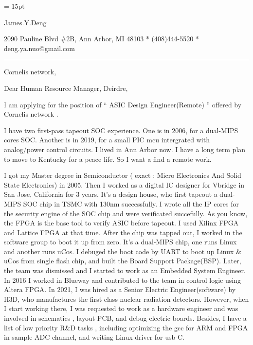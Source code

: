 

  \FFrg \baselineskip = 15pt

{
James.Y.Deng
}

{ 
2090 Pauline Blvd \#2B, Ann Arbor, MI 48103
*
(408)444-5520
*
deng.ya.nuo@gmail.com
}

{ \smallbreak } 

{\par\noindent\hrule} 

{ \bigbreak } 



Cornelis network, 


{ \bigbreak } 
{ 
Dear Human Resource Manager, Deirdre,
}

{ \bigbreak } 
I am applying for the position of `` 
ASIC Design Engineer(Remote)
'' offered by Cornelis network .

{ \bigbreak } 
I have two first-pass tapeout SOC experience.
One is in 2006, for a dual-MIPS cores SOC. 
Another is in 2019, for a small PIC mcu intergrated with analog/power control circuits.
I lived in Ann Arbor now. I have a long term plan to move to Kentucky for a peace life.
So I want a find a remote work.

{ \bigbreak } 
I got my Master degree in Semiconductor ( exact : Micro Electronics And Solid State Electronics) in 2005.
Then I worked as a digital IC designer for Vbridge in San Jose, California for 3 years.
It's a design house, who first tapeout a dual-MIPS SOC chip in TSMC with 130nm successfully.
I wrote all the IP cores for the security engine of the SOC chip and were verificated succefully.
As you know, the FPGA is the base tool to verify ASIC before tapeout.
I used Xilinx FPGA and Lattice FPGA at that time.
After the chip was tapped out, I worked in the software group to boot it up from zero.
It's a dual-MIPS chip, one runs Linux and another runs uCos.
I debuged the boot code by UART to boot up Linux \& uCos from single flash chip,
and built the Board Support Package(BSP).
Later, the team was dismissed and I started to work as an Embedded System Engineer.
In 2016 I worked in Blueway and contributed to the team in control logic using Altera FPGA.
In 2021, I was hired as a Senior Electric Engineer(software) by H3D, 
who manufactures the first class nuclear radiation detectors.
However, when I start working there, I was requested to work as
a hardware engineer and was involved in schematics , layout PCB, and debug electric boards.
Besides, I have a list of low priority R\&D tasks , 
including optimizing the gcc for ARM and FPGA in sample ADC channel,
and writing Linux driver for usb-C.

